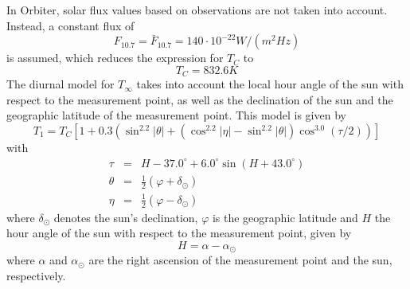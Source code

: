\documentclass[a4paper]{article}
\begin{document}
In Orbiter, solar flux values based on observations are not taken into account. Instead, a constant flux of
\begin{equation}
F_{10.7} = \bar{F}_{10.7} = 140 \cdot 10^{-22} W/(m^2 Hz)
\end{equation}
is assumed, which reduces the expression for $T_C$ to
\begin{equation}
T_C = 832.6K
\end{equation}
The diurnal model for $T_\infty$ takes into account the local hour angle of the sun with respect to the measurement point, as well as the declination of the sun and the geographic latitude of the measurement point. This model is given by
\begin{equation}
T_1 = T_C \left[ 1 + 0.3 \left( \sin^{2.2}|\theta| + (\cos^{2.2}|\eta| - \sin^{2.2}|\theta|) \cos^{3.0}(\tau/2) \right) \right]
\end{equation}
with
\begin{eqnarray}
\tau &=& H - 37.0^\circ + 6.0^\circ \sin(H+43.0^\circ) \\
\theta &=& \frac{1}{2} (\varphi + \delta_\odot ) \\
\eta &=& \frac{1}{2} (\varphi - \delta_\odot)
\end{eqnarray}
where $\delta_\odot$ denotes the sun's declination, $\varphi$ is the geographic latitude and $H$ the hour angle of the sun with respect to the measurement point, given by
\begin{equation}
H = \alpha - \alpha_\odot
\end{equation}
where $\alpha$ and $\alpha_\odot$ are the right ascension of the measurement point and the sun, respectively.
\end{document}
